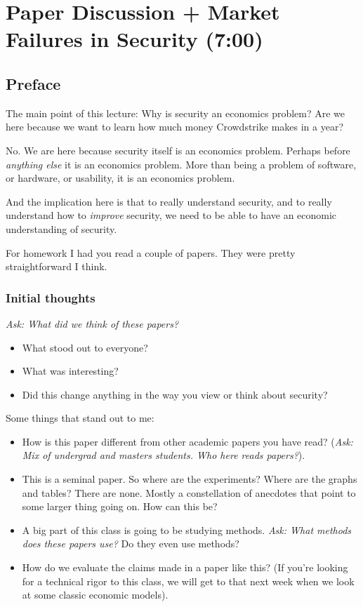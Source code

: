 \documentclass[11pt]{article}
\begin{document}

\section{Paper Discussion + Market Failures in Security (7:00)}


\subsection{Preface}

The main point of this lecture: Why is security an economics problem? Are we here because we want to learn how much money Crowdstrike makes in a year?

No. We are here because security itself is an economics problem. Perhaps before \textit{anything else} it is an economics problem. More than being a problem of software, or hardware, or usability, it is an economics problem.

And the implication here is that to really understand security, and to really understand how to \textit{improve} security, we need to be able to have an economic understanding of security. 

For homework I had you read a couple of papers. They were pretty straightforward I think.

\subsubsection{Initial thoughts}

{\it Ask: What did we think of these papers?}

\begin{itemize}
    \item What stood out to everyone?
    \item What was interesting?
    \item Did this change anything in the way you view or think about security?
\end{itemize}

Some things that stand out to me:

\begin{itemize}
    \item How is this paper different from other academic papers you have read? ({\it Ask: Mix of undergrad and masters students. Who here reads papers?}). 
    \item This is a seminal paper. So where are the experiments? Where are the graphs and tables? There are none. Mostly a constellation of anecdotes that point to some larger thing going on. How can this be?
    \item A big part of this class is going to be studying methods. {\it Ask: What methods does these papers use?} Do they even use methods?
    \item How do we evaluate the claims made in a paper like this?  (If you're looking for a technical rigor to this class, we will get to that next week when we look at some classic economic models).
  
\end{itemize}
\end{document}
